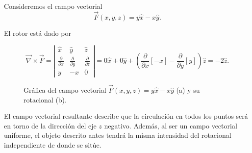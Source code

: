 \begin{ejemplo}
    Consideremos el campo vectorial
    $$\Vec{F}(x,y,z) = y \hat{x} - x\hat{y}.$$
    
    El rotor está dado por
    
    $$\vec{\nabla} \times \vec{F} = \left| \begin{array}{ccc}
    \hat{x} & \hat{y} & \hat{z}  \\
    \frac{\partial}{\partial x} & \frac{\partial}{\partial y} & \frac{\partial}{\partial z}  \\
    y & -x & 0
    \end{array} \right| = 0 \hat{x} + 0 \hat{y} + \left( \frac{\partial}{\partial x}[-x] - \frac{\partial}{\partial y} [y]\right) \hat{z} = -2 \hat{z}.$$ 

    \begin{figure}[H]
        \centering
         \hspace{1cm}
        \caption{Gráfica del campo vectorial $\Vec{F}(x,y,z) = y \hat{x} - x\hat{y}$ (a) y su rotacional (b).}
        \label{fig:Ej_Rotor}
    \end{figure}
    
    El campo vectorial resultante describe que la circulación en todos los puntos será en torno de la dirección del eje $z$ negativo. Además, al ser un campo vectorial uniforme, el objeto descrito antes tendrá la misma intensidad del rotacional independiente de donde se sitúe.
\end{ejemplo}

